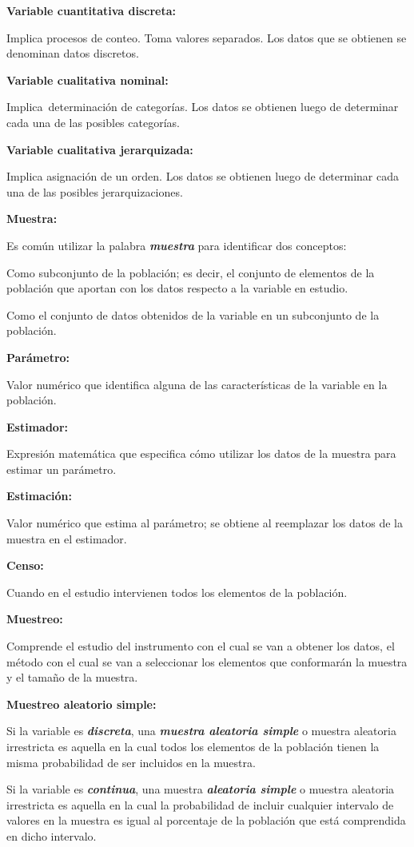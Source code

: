 \documentclass[a5paper,doc,10pt,noapacite]{apa6}
\newcommand{\neodefi}[1]{%
	\vspace{1\baselineskip}
	\textbf{\small#1} \newline
}
\begin{document}
{{\neodefi{Variable cuantitativa discreta:}
	Implica procesos de conteo. Toma valores separados. Los datos que se obtienen se denominan datos discretos.
 
\neodefi{Variable cualitativa nominal:}
	Implica determinación de categorías. Los datos se obtienen luego de determinar cada una de las posibles categorías.
 
\neodefi{Variable cualitativa jerarquizada:}
	Implica asignación de un orden. Los datos se obtienen luego de determinar cada una de las posibles jerarquizaciones.

\neodefi{Muestra:}
	Es común utilizar la palabra \emph{\textbf{muestra}} para identificar dos conceptos:
	\begin{seriate}
		\item	Como subconjunto de la población; es decir, el conjunto de elementos de la población que aportan con los datos respecto a la variable en estudio.
		\item	Como el conjunto de datos obtenidos de la variable en un subconjunto de la población.
	\end{seriate}
	
\neodefi{Parámetro:}
	Valor numérico que identifica alguna de las características de la variable en la población. 
	
\neodefi{Estimador:}
	Expresión matemática que especifica cómo utilizar los datos de la muestra para estimar un parámetro. 
	
\neodefi{Estimación:}
	Valor numérico que estima al parámetro; se obtiene al reemplazar los datos de la muestra en el estimador. 
	
\neodefi{Censo:}
	Cuando en el estudio intervienen todos los elementos de la población.
	
\neodefi{Muestreo:}
	Comprende el estudio del instrumento con el cual se van a obtener los datos, el método con el cual se van a seleccionar los elementos que conformarán la muestra y el tamaño de la muestra. 
	
\neodefi{Muestreo aleatorio simple:}
	Si la variable es \emph{\textbf{discreta}}, una \emph{\textbf{muestra aleatoria simple}} o muestra aleatoria irrestricta es aquella en la cual todos los elementos de la población tienen la misma probabilidad de ser incluidos en la muestra.
	
	Si la variable es \emph{\textbf{continua}}, una muestra \emph{\textbf{aleatoria simple}} o muestra aleatoria irrestricta es aquella en la cual la probabilidad de incluir cualquier intervalo de valores en la muestra es igual al porcentaje de la población que está comprendida en dicho intervalo.
	
}}
\end{document}
